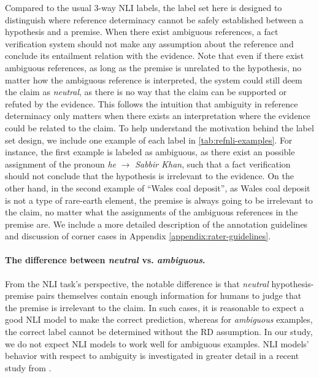 Compared to the usual 3-way NLI labels, the label set here is designed to distinguish where reference determinacy cannot be safely established between a hypothesis and a premise. 
When there exist ambiguous references, a fact verification system should not make any assumption about the reference and conclude its entailment relation with the evidence. 
Note that even if there exist ambiguous references, as long as the premise is unrelated to the hypothesis, no matter how the ambiguous reference is interpreted, the system could still deem the claim as \emph{neutral}, as there is no way that the claim can be supported or refuted by the evidence. This follows the intuition that ambiguity in reference determinacy only matters when there exists an interpretation where the evidence could be related to the claim.
To help understand the motivation behind the label set design, we include one example of each label in \autoref{tab:refnli-examples}. For instance, the first example is labeled as ambiguous, as there exist an possible assignment of the pronoun \emph{he} $\rightarrow$ \emph{Sabbir Khan}, such that a fact verification should not conclude that the hypothesis is irrelevant to the evidence. On the other hand, in the second example of ``Wales coal deposit'', as Wales coal deposit is not a type of rare-earth element, the premise is always going to be irrelevant to the claim, no matter what the assignments of the ambiguous references in the premise are. 
We include a more detailed description of the annotation guidelines and discussion of corner cases in Appendix \ref{appendix:rater-guidelines}.

\paragraph{The difference between \textit{neutral} vs. \textit{ambiguous}.}  From the NLI task's perspective, the notable difference is that \emph{neutral} hypothesis-premise pairs themselves contain enough information for humans to judge that the premise is irrelevant to the claim. In such cases, it is reasonable to expect a good NLI model to make the correct prediction, whereas for \emph{ambiguous} examples, the correct label cannot be determined without the RD assumption. In our study, we do not expect NLI models to work well for ambiguous examples. NLI models' behavior with respect to ambiguity is investigated in greater detail in a recent study from \citet{liu-etal-2023-afraid}. 


